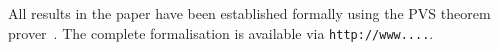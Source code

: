 All results in the paper have been established formally using
the PVS theorem prover~\cite{OwreRRSS96}. The complete formalisation
is available via \texttt{http://www....}.



